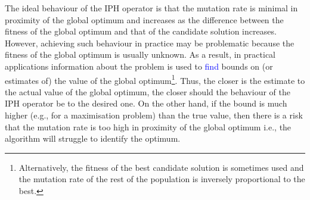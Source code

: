 \documentclass[lettersize,journal]{IEEEtran}
\newcommand{\new}[1]{\textcolor{blue}{#1}}
\begin{document}
%
The ideal behaviour of the IPH operator is that the mutation rate is minimal in proximity of the global optimum and increases as the difference between the fitness of the global optimum
and that of the candidate solution increases. However, achieving such behaviour in practice may be problematic because the fitness of the global optimum is usually unknown.
As a result, in practical applications information about the problem is used to \new{find} bounds on (or estimates of)  the value of the global optimum\footnote{Alternatively, the fitness of the best candidate solution is sometimes used and 
	the mutation rate of the rest of the population is inversely proportional to the best.}.
Thus, the closer is the estimate to the actual value of the global optimum, the closer should the behaviour of the IPH operator be to the desired one.
On the other hand,  if the bound is much higher (e.g., for a maximisation problem)  than the true value, then there is a risk that the mutation rate is too high in proximity of the global optimum 
i.e., the algorithm will struggle to identify the optimum. 
\end{document}
